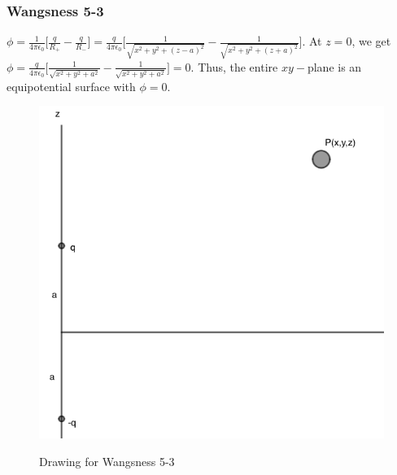 \documentclass{article}
\theoremstyle{mystyle}
\begin{document}
\subsubsection{Wangsness 5-3}
$\phi = \frac{1}{4\pi \epsilon_0}\big[ \frac{q}{R_{+}} - \frac{q}{R_{-}}\big] = \frac{q}{4\pi \epsilon_0}\big[\frac{1}{\sqrt{x^2+y^2+(z-a)^2}}-\frac{1}{\sqrt{x^2+y^2+(z+a)^2}}\big]$. At $z=0$, we get $\phi = \frac{q}{4\pi \epsilon_0}\big[ \frac{1}{\sqrt{x^2+y^2+a^2}}-\frac{1}{\sqrt{x^2+y^2+a^2}}\big] = 0$. Thus, the entire $xy-$plane is an equipotential surface with $\phi = 0$.
\begin{figure}[htbp]
  \centering
    {\includegraphics[scale=0.4]{5-3.png}}
    \caption{Drawing for Wangsness 5-3}
\end{figure}
\end{document}
